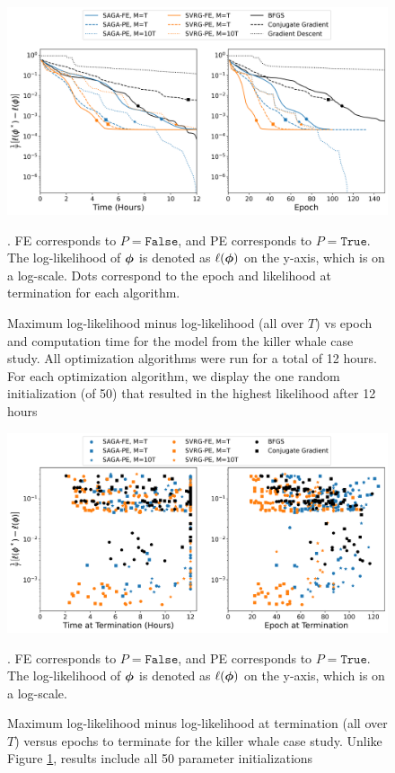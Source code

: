 \begin{figure}
    \centering
    \includegraphics[width=6in]{../plt/log-like_case_study.png}
    \caption{
    Maximum log-likelihood minus log-likelihood (all over $T$) vs epoch and computation time for the model from the killer whale case study. All optimization algorithms were run for a total of 12 hours. For each optimization algorithm, we display the one random initialization (of 50) that resulted in the highest likelihood after 12 hours}. FE corresponds to $P = \texttt{False}$, and PE corresponds to $P = \texttt{True}$. The log-likelihood of $\boldsymbol{\phi}$ is denoted as $\ell(\boldsymbol{\phi})$ on the y-axis, which is on a log-scale. Dots correspond to the epoch and likelihood at termination for each algorithm.
    \label{fig:ll_trace_case}
\end{figure}
%
\begin{figure}%
    \centering
    \includegraphics[width=6in]{../plt/scatterplot_case_study.png}
    \caption{Maximum log-likelihood minus log-likelihood at termination (all over $T$) versus epochs to terminate for the killer whale case study. Unlike Figure \ref{fig:ll_trace_case}, results include all 50 parameter initializations}. FE corresponds to $P = \texttt{False}$, and PE corresponds to $P = \texttt{True}$. The log-likelihood of $\boldsymbol{\phi}$ is denoted as $\ell(\boldsymbol{\phi})$ on the y-axis, which is on a log-scale.
    \label{fig:scatterplot_case}
\end{figure}
